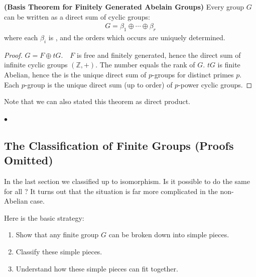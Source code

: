 \documentclass{article}
\newcommand{\bfs}[1]{\textbf{({#1}) }}
\begin{document}
\begin{thma}\bfs{Basis Theorem for Finitely Generated Abelain Groups}
Every  group $G$ can be written as a direct sum of cyclic groups:
\begin{align*}
G=\beta_{1} \oplus \cdots \oplus \beta_{r}
\end{align*}
where each $\beta_{i}$ is , and the orders which occurs are uniquely determined.
\end{thma}
\begin{proof}
$G=F \oplus t G . \quad F$ is free and finitely generated, hence the direct sum of infinite cyclic groups $(\mathbb{Z},+)$. The number equals the rank of $G$. $t G$ is finite Abelian, hence the is the unique direct sum of $p$-groups for distinct primes $p$. Each $p$-group is the unique direct sum (up to order) of $p$-power cyclic groups. 
\end{proof}
 Note that we can also stated this theorem as direct product. 
 
$\bullet$ 

\subsection{The Classification of Finite Groups (Proofs Omitted)}
In the last section we classified  up to isomorphism. Is it possible to do the same for all ? It turns out that the situation is far more complicated in the non-Abelian case. 

Here is the basic strategy:
\begin{enumerate}
    \item Show that any finite group $G$ can be broken down into simple pieces.
\item Classify these simple pieces.
\item Understand how these simple pieces can fit together.
\end{enumerate}
\end{document}

